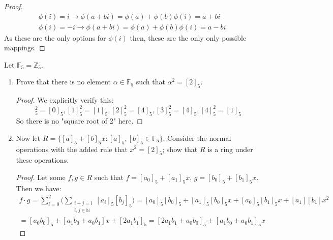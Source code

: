 \documentclass[12pt]{article}
\newenvironment{ex}[2][Exercise]{\begin{trivlist}
\item[\hskip \labelsep {\bfseries #1}\hskip \labelsep {\bfseries #2.}]}{\end{trivlist}}
\begin{document}
\begin{ex}{1}
\begin{enumerate}[label=(\alph*)]
\begin{proof}
            \begin{equation}
                \begin{aligned}
                    \phi(i) = i \rightarrow \phi(a + bi) = \phi(a) +  \phi(b)\phi(i) = a + bi \\
                    \phi(i) = -i \rightarrow \phi(a + bi) = \phi(a) +  \phi(b)\phi(i) = a - bi
                \end{aligned}
            \end{equation}
            As these are the only options for $\phi(i)$ then, these are the only only possible mappings.
        \end{proof}
    \end{enumerate}
\end{ex}

\begin{ex}{2}
    Let $\mathbb{F}_5 = \mathbb{Z}_5$.
    \begin{enumerate}[label=(\alph*)]
        \item Prove that there is no element $\alpha \in \mathbb{F}_5$ such that $\alpha^2 = [2]_5$. 
        \begin{proof}
            We explicitly verify this:
            \begin{equation}
                [0]_5^2 = [0]_5, [1]_5^2 = [1]_5, [2]_5^2 = [4]_5, [3]_5^2 = [4]_5, [4]_5^2 = [1]_5
            \end{equation}
        So there is no "square root of 2" here.
        \end{proof}
        \item Now let $R = \{[a]_5 + [b]_5x : [a]_5, [b]_5 \in \mathbb{F}_5\}$. Consider the normal operations with the added rule that $x^2 = [2]_5$; show that $R$ is a ring under these operations.
        \begin{proof}
            Let some $f, g \in R$ such that $f = [a_0]_5 + [a_1]_5x$, $g = [b_0]_5 + [b_1]_5x$. Then we have:
            \begin{equation}
                \begin{aligned}
                f \cdot g = \sum_{l = 0}^2 \Big ( \sum_{\substack{i + j = l \\ i, j \in \mathbb{N}}} [a_i]_5[b_j]_5 \Big ) = [a_0]_5[b_0]_5 + [a_1]_5[b_0]_5x+ [a_0]_5[b_1]_5x + [a_1][b_1]x^2 \\
                = [a_0b_0]_5 + [a_1b_0 + a_0b_1]x + [2a_1b_1]_5 = [2a_1b_1 + a_0b_0]_5 + [a_1b_0 + a_0b_1]_5x 
                \end{aligned}
            \end{equation}

\end{proof}
\end{enumerate}
\end{ex}
\end{document}
